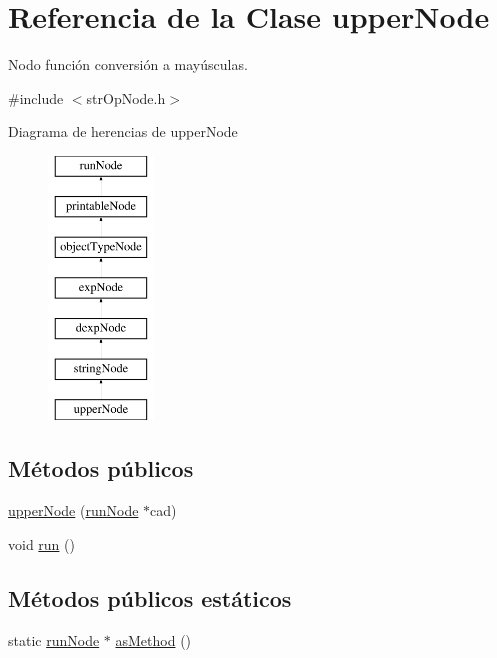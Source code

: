 \hypertarget{classupperNode}{\section{Referencia de la Clase upper\-Node}
\label{classupperNode}
}


Nodo función conversión a mayúsculas.  




{\ttfamily \#include $<$str\-Op\-Node.\-h$>$}

Diagrama de herencias de upper\-Node\begin{figure}[H]
\begin{center}
\leavevmode
\includegraphics[height=7.000000cm]{classupperNode}
\end{center}
\end{figure}
\subsection*{Métodos públicos}
\begin{DoxyCompactItemize}
\item 
\hyperlink{classupperNode_adf506d723bdebd69295a636535373a52}{upper\-Node} (\hyperlink{classrunNode}{run\-Node} $\ast$cad)
\item 
void \hyperlink{classupperNode_ab8cb550c4e8645bf27789f01d53a6b89}{run} ()
\end{DoxyCompactItemize}
\subsection*{Métodos públicos estáticos}
\begin{DoxyCompactItemize}
\item 
static \hyperlink{classrunNode}{run\-Node} $\ast$ \hyperlink{classupperNode_a76620cf64e0b01eb1a89d10b7cc7b5d9}{as\-Method} ()
\end{DoxyCompactItemize}
